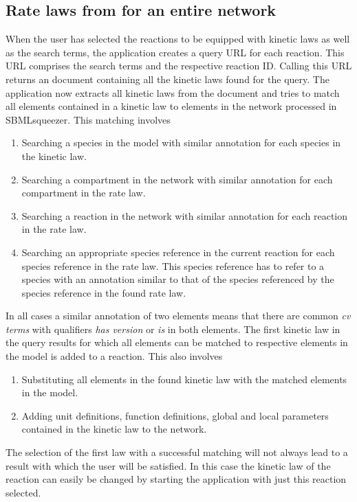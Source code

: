 \subsection{Rate laws from \SABIO for an entire network}
When the user has selected the reactions to be equipped with kinetic laws as well as the search terms, the application creates a query URL for each reaction. 
This URL comprises the search terms and the respective \KEGG reaction \ac{ID}. 
Calling this URL returns an \SBML document containing all the kinetic laws found for the query. 
The application now extracts all kinetic laws from the \SBML document and tries to match all elements contained in a kinetic law to elements in the network processed in SBMLsqueezer. 
This matching involves
\begin{enumerate}
\item
Searching a species in the model with similar annotation for each species in the kinetic law.
\item
Searching a compartment in the network with similar annotation for each compartment in the rate law.
\item
Searching a reaction in the network with similar annotation for each reaction in the rate law.
\item
Searching an appropriate species reference in the current reaction for each species reference in the rate law. 
This species reference has to refer to a species with an annotation similar to that of the species referenced by the species reference in the found rate law.
\end{enumerate}
In all cases a similar annotation of two \SBML elements means that there are common \emph{cv terms} with qualifiers \emph{has version} or \emph{is} in both elements. 
The first kinetic law in the query results for which all elements can be matched to respective elements in the model is added to a reaction. 
This also involves
\begin{enumerate}
\item
Substituting all elements in the found kinetic law with the matched elements in the model.
\item
Adding unit definitions, function definitions, global and local parameters contained in the kinetic law to the network.
\end{enumerate}
The selection of the first law with a successful matching will not always lead to a result with which the user will be satisfied. 
In this case the kinetic law of the reaction can easily be changed by starting the application with just this reaction selected.

